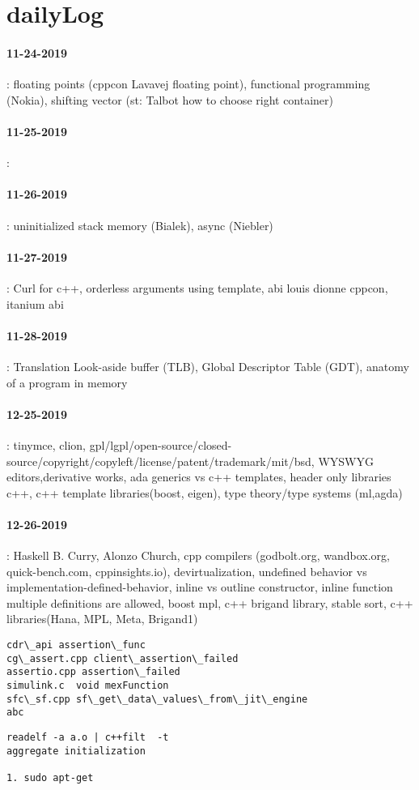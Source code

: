 \section{dailyLog} 
\paragraph{11-24-2019}: floating points (cppcon Lavavej floating point), functional programming (Nokia), shifting vector (st: Talbot how to choose right container)
\paragraph{11-25-2019}:
\paragraph{11-26-2019}: uninitialized stack memory (Bialek), async (Niebler) 
\paragraph{11-27-2019}: Curl for c++, orderless arguments using template, abi louis dionne cppcon, itanium abi
\paragraph{11-28-2019}: Translation Look-aside buffer (TLB), Global Descriptor Table (GDT), anatomy of a program in memory 
\paragraph{12-25-2019}: tinymce, clion, gpl/lgpl/open-source/closed-source/copyright/copyleft/license/patent/trademark/mit/bsd, WYSWYG editors,derivative works, ada generics vs c++ templates, header only libraries c++, c++ template libraries(boost, eigen), type theory/type systems
(ml,agda)
\paragraph{12-26-2019}: Haskell B. Curry, Alonzo Church, cpp compilers (godbolt.org, wandbox.org, quick-bench.com, cppinsights.io), devirtualization,
undefined behavior vs implementation-defined-behavior, inline vs outline constructor, inline function multiple definitions are allowed, 
boost mpl, c++ brigand library, stable sort, c++ libraries(Hana, MPL, Meta, Brigand1)
\begin{verbatim}
cdr\_api assertion\_func
cg\_assert.cpp client\_assertion\_failed 
assertio.cpp assertion\_failed
simulink.c  void mexFunction
sfc\_sf.cpp sf\_get\_data\_values\_from\_jit\_engine
abc
\end{verbatim}

\begin{verbatim}
readelf -a a.o | c++filt  -t
aggregate initialization

1. sudo apt-get
\end{verbatim}

